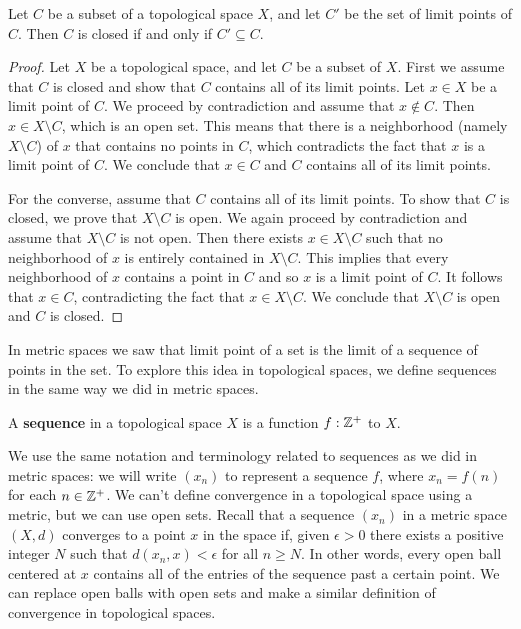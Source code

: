 \begin{theorem} \label{thm:TS_closed_limitpoints} Let $C$ be a subset of a topological space $X$, and let $C'$ be the set of limit points of $C$. Then $C$ is closed if and only if $C' \subseteq C$.  
\end{theorem}

\begin{proof} Let $X$ be a topological space, and let $C$ be a subset of $X$. First we assume that $C$ is closed and show that $C$ contains all of its limit points. Let $x \in X$ be a limit point of $C$. We proceed by contradiction and assume that $x \notin C$. Then $x \in X \setminus C$, which is an open set. This means that there is a neighborhood (namely $X \setminus C$) of $x$ that contains no points in $C$, which contradicts the fact that $x$ is a limit point of $C$. We conclude that $x \in C$ and $C$ contains all of its limit points.

For the converse, assume that $C$ contains all of its limit points. To show that $C$ is closed, we prove that $X \setminus C$ is open. We again proceed by contradiction and assume that $X \setminus C$ is not open. Then there exists $x \in X \setminus C$ such that no neighborhood of $x$ is entirely contained in $X \setminus C$. This implies that every neighborhood of $x$ contains a point in $C$ and so $x$ is a limit point of $C$. It follows that $x \in C$, contradicting the fact that $x \in X \setminus C$. We conclude that $X \setminus C$ is open and $C$ is closed.
\end{proof}

In metric spaces we saw that limit point of a set is the limit of a sequence of points in the set. To explore this idea in topological spaces, we define sequences in the same way we did in metric spaces. 

\begin{definition} A \textbf{sequence} in a topological space $X$ is a function $f: \mathbb{Z}^+$ to $X$.
\end{definition}

We use the same notation and terminology related to sequences as we did in metric spaces: we will write $(x_n)$ to represent a sequence $f$, where $x_n = f(n)$ for each $ n \in \mathbb{Z}^+$. We can't define convergence in a topological space using a metric, but we can use open sets. Recall that a sequence $(x_n)$ in a metric space $(X,d)$ converges to a point $x$ in the space if, given $\epsilon > 0$ there exists a positive integer $N$ such that $d(x_n,x) < \epsilon$ for all $n \geq N$. In other words,  every open ball centered at $x$ contains all of the entries of the sequence past a certain point. We can replace open balls with open sets and make a similar definition of convergence in topological spaces. 

